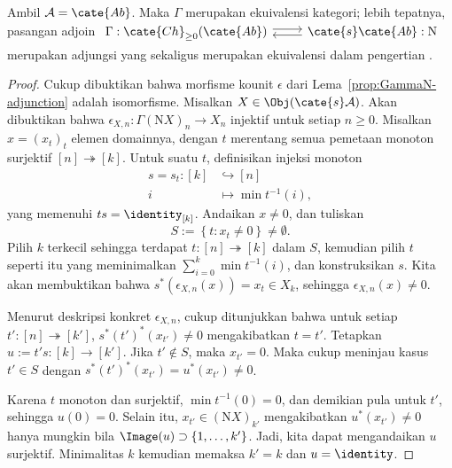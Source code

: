 \begin{lemma}\label{prop:DK-Ab}
	Ambil $\mathcal{A}=\cate{Ab}$. Maka $\Gamma$ merupakan ekuivalensi kategori; lebih
	tepatnya, pasangan adjoin
	$\begin{tikzcd}
		\Gamma: \cate{Ch}_{\geq 0}(\cate{Ab}) \arrow[shift left, r] & \cate{s}\cate{Ab} : \mathrm{N} \arrow[shift left, l]
	\end{tikzcd}$
	merupakan adjungsi yang sekaligus merupakan ekuivalensi dalam pengertian
	\cite[Teorema 2.6.12]{Li1}.
\end{lemma}
\begin{proof}
	Cukup dibuktikan bahwa morfisme kounit $\epsilon$ dari
	Lema~\ref{prop:GammaN-adjunction} adalah isomorfisme. Misalkan
	$X\in\Obj(\cate{s}\mathcal{A})$. Akan dibuktikan bahwa
	$\epsilon_{X,n}:\Gamma(\mathrm{N}X)_n\to X_n$ injektif untuk setiap
	$n\geq0$. Misalkan $x=(x_t)_t$ elemen domainnya, dengan $t$ merentang
	semua pemetaan monoton surjektif $[n]\twoheadrightarrow[k]$. Untuk suatu
	$t$, definisikan injeksi monoton
	\begin{align*}
		s = s_t : [k] & \hookrightarrow [n] \\
		i & \mapsto \min t^{-1}(i),
	\end{align*}
	yang memenuhi $ts=\identity_{[k]}$. Andaikan $x\neq0$, dan tuliskan
	\[ S := \left\{t: x_t \neq 0 \right\} \neq \emptyset. \]
	Pilih $k$ terkecil sehingga terdapat $t:[n]\twoheadrightarrow[k]$ dalam
	$S$, kemudian pilih $t$ seperti itu yang meminimalkan
	$\sum_{i=0}^k\min t^{-1}(i)$, dan konstruksikan $s$. Kita akan membuktikan
	bahwa $s^*(\epsilon_{X,n}(x))=x_t\in X_k$, sehingga
	$\epsilon_{X,n}(x)\neq0$.

	Menurut deskripsi konkret $\epsilon_{X,n}$, cukup ditunjukkan bahwa untuk
	setiap $t':[n]\twoheadrightarrow[k']$,
	$s^*(t')^*(x_{t'})\neq0$ mengakibatkan $t=t'$. Tetapkan
	$u:=t's:[k]\to[k']$. Jika $t'\notin S$, maka $x_{t'}=0$. Maka cukup
	meninjau kasus $t'\in S$ dengan
	$s^*(t')^*(x_{t'})=u^*(x_{t'})\neq0$.

	Karena $t$ monoton dan surjektif, $\min t^{-1}(0)=0$, dan demikian pula
	untuk $t'$, sehingga $u(0)=0$. Selain itu,
	$x_{t'}\in(\mathrm{N}X)_{k'}$ mengakibatkan
	$u^*(x_{t'})\neq0$ hanya mungkin bila
	$\Image(u)\supset\{1,\ldots,k'\}$. Jadi, kita dapat mengandaikan $u$
	surjektif. Minimalitas $k$ kemudian memaksa $k'=k$ dan
	$u=\identity$.


\end{proof}
